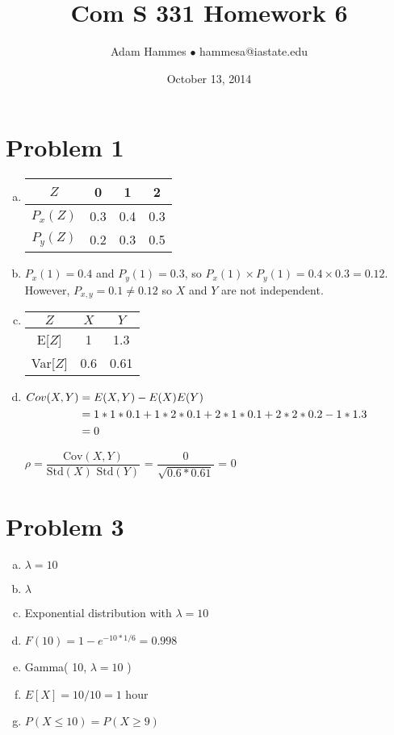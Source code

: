 \documentclass[11pt]{article}
\newenvironment{equ}{$\hfill\begin{aligned}[t]}{\end{aligned}\hfill \null$}
\begin{document}
\title{Com S 331 Homework 6}
\author{Adam Hammes $\bullet$ hammesa@iastate.edu}
\date{October 13, 2014}
\maketitle

\section*{Problem 1}
\begin{enumerate}[(a)]
	\item
		\begin{tabular}{ c | c c c}
			$Z$	& 0 & 1 & 2 \\
			\hline
			$P_x(Z)$ & 0.3 & 0.4 & 0.3 \\
			$P_y(Z)$ & 0.2 & 0.3 & 0.5
		\end{tabular}
		
	\item
		$P_x(1) = 0.4$ and $P_y(1) = 0.3$, so $P_x(1) \times P_y(1) = 0.4 \times 0.3 = 0.12$. However, $P_{x,y} = 0.1 \neq 0.12$ so $X$ and $Y$ are not independent.
		
	\item
		\begin{tabular}{ c | c c }
			$Z$ & $X$ & $Y$ \\
			\hline
			E[$Z$] & 1 & 1.3 \\
			Var[$Z$] & 0.6 & 0.61 
		\end{tabular}
		
	\item 
		\begin{equ}
			Cov(X,Y) &= E(X,Y) - E(X)E(Y) \\
			&= 1*1*0.1 + 1*2*0.1 +2*1*0.1 + 2*2*0.2 - 1*1.3 \\
			&= 0
		\end{equ}
		
		$\rho = \dfrac{\text{Cov}(X,Y)}{\text{Std}(X)\text{ Std}(Y)}$ = $\dfrac{0}{\sqrt{0.6 * 0.61}}$ = 0
\end{enumerate}


\section*{Problem 3}
\begin{enumerate}[(a)]
	\item $\lambda = 10$
	\item $\lambda$
	\item Exponential distribution with $\lambda = 10$
	\item $F(10) = 1 - e^{-10 * 1/6} = 0.998$
	\item Gamma( 10, $\lambda = 10$ )
	\item $E[X] = 10/10 = 1$ hour
	\item $P(X \leq 10) = P(X \geq 9)$

\end{enumerate}
\end{document}
